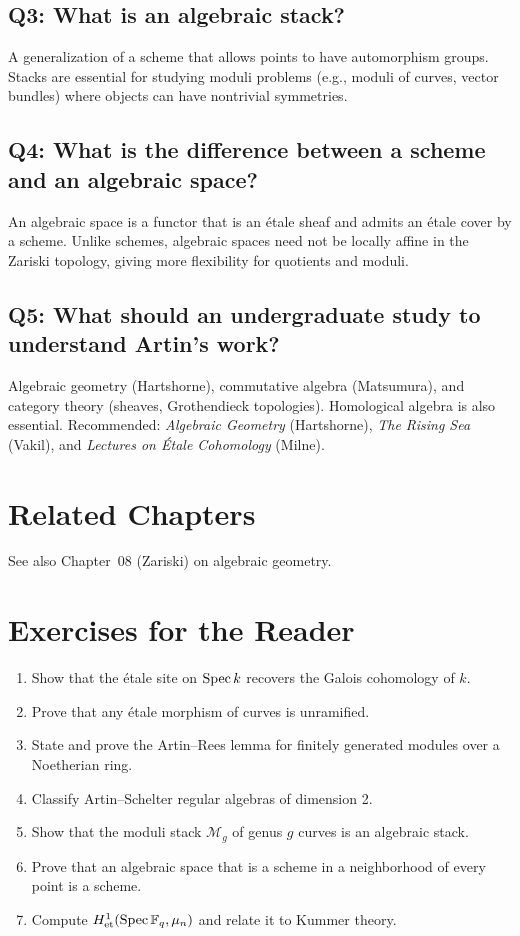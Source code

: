 \subsection*{Q3: What is an algebraic stack?}
A generalization of a scheme that allows points to have automorphism groups. Stacks are essential for studying moduli problems (e.g., moduli of curves, vector bundles) where objects can have nontrivial symmetries.

\subsection*{Q4: What is the difference between a scheme and an algebraic space?}
An algebraic space is a functor that is an \'etale sheaf and admits an \'etale cover by a scheme. Unlike schemes, algebraic spaces need not be locally affine in the Zariski topology, giving more flexibility for quotients and moduli.

\subsection*{Q5: What should an undergraduate study to understand Artin's work?}
Algebraic geometry (Hartshorne), commutative algebra (Matsumura), and category theory (sheaves, Grothendieck topologies). Homological algebra is also essential. Recommended: \textit{Algebraic Geometry} (Hartshorne), \textit{The Rising Sea} (Vakil), and \textit{Lectures on \'Etale Cohomology} (Milne).

\section{Related Chapters}
See also Chapter~08 (Zariski) on algebraic geometry.

\section*{Exercises for the Reader}

\begin{enumerate}
    \item [I] Show that the \'etale site on $\operatorname{Spec} k$ recovers the Galois cohomology of $k$.
    \item [B] Prove that any \'etale morphism of curves is unramified.
    \item [B] State and prove the Artin--Rees lemma for finitely generated modules over a Noetherian ring.
    \item [I] Classify Artin--Schelter regular algebras of dimension 2.
    \item [A] Show that the moduli stack $\mathcal{M}_g$ of genus $g$ curves is an algebraic stack.
    \item [I] Prove that an algebraic space that is a scheme in a neighborhood of every point is a scheme.
    \item [I] Compute $H^1_{\operatorname{et}}(\operatorname{Spec} \mathbb{F}_q, \mu_n)$ and relate it to Kummer theory.
\end{enumerate}

